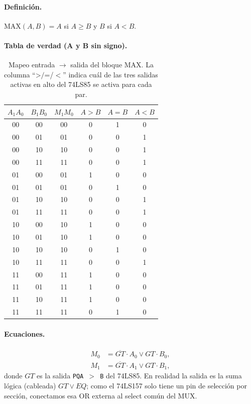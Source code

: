 \documentclass[a4paper,12pt]{article}
\begin{document}
\paragraph{Definici\'{o}n.} $\mathrm{MAX}(A,B) = A$ si $A \ge B$ y $B$
si $A < B$.

\paragraph{Tabla de verdad (A y B sin signo).}
\begin{table}[H]
\centering
\small
\begin{tabular}{cc|cccc}
\toprule
$A_1A_0$ & $B_1B_0$ & $M_1M_0$ & $A>B$ & $A=B$ & $A<B$ \\
\midrule
00 & 00 & 00 & 0 & 1 & 0 \\
00 & 01 & 01 & 0 & 0 & 1 \\
00 & 10 & 10 & 0 & 0 & 1 \\
00 & 11 & 11 & 0 & 0 & 1 \\
01 & 00 & 01 & 1 & 0 & 0 \\
01 & 01 & 01 & 0 & 1 & 0 \\
01 & 10 & 10 & 0 & 0 & 1 \\
01 & 11 & 11 & 0 & 0 & 1 \\
10 & 00 & 10 & 1 & 0 & 0 \\
10 & 01 & 10 & 1 & 0 & 0 \\
10 & 10 & 10 & 0 & 1 & 0 \\
10 & 11 & 11 & 0 & 0 & 1 \\
11 & 00 & 11 & 1 & 0 & 0 \\
11 & 01 & 11 & 1 & 0 & 0 \\
11 & 10 & 11 & 1 & 0 & 0 \\
11 & 11 & 11 & 0 & 1 & 0 \\
\bottomrule
\end{tabular}
\caption{Mapeo entrada $\rightarrow$ salida del bloque MAX. La columna
``>$/$=/$<$'' indica cu\'{a}l de las tres salidas activas en alto del
74LS85 se activa para cada par.}
\label{tab:max}
\end{table}

\paragraph{Ecuaciones.}
\begin{align}
M_0 &= \overline{GT}\cdot A_0 \lor GT\cdot B_0,\\
M_1 &= \overline{GT}\cdot A_1 \lor GT\cdot B_1,
\end{align}
donde $GT$ es la salida \texttt{PQA $>$ B} del 74LS85. En realidad la
salida es la suma l\'{o}gica (cableada) $GT \lor EQ$; como el
74LS157 solo tiene un pin de selecci\'{o}n por secci\'{o}n, conectamos
esa OR externa al select com\'{u}n del MUX.
\end{document}
